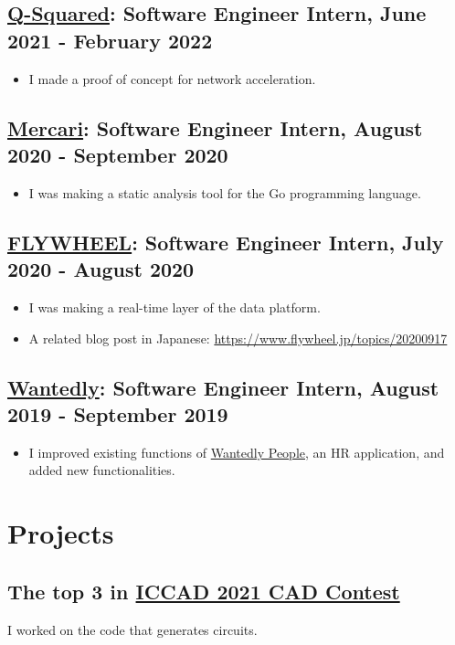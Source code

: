 \documentclass[12pt]{article}
\begin{document}
  \subsection*{\href{https://q-squared.jp}{Q-Squared}: Software Engineer Intern, June 2021 - February 2022}
    \begin{itemize}
      \item I made a proof of concept for network acceleration.
    \end{itemize}
  \subsection*{\href{https://about.mercari.com/en}{Mercari}: Software Engineer Intern, August 2020 - September 2020}
    \begin{itemize}
      \item I was making a static analysis tool for the Go programming language.
    \end{itemize}
  \subsection*{\href{https://www.flywheel.jp}{FLYWHEEL}: Software Engineer Intern, July 2020 - August 2020}
    \begin{itemize}
      \item I was making a real-time layer of the data platform.
      \item A related blog post in Japanese: \url{https://www.flywheel.jp/topics/20200917}
    \end{itemize}
  \subsection*{\href{https://wantedlyinc.com/ja}{Wantedly}: Software Engineer Intern, August 2019 - September 2019}
    \begin{itemize}
      \item I improved existing functions of \href{https://people.wantedly.com/}{Wantedly People}, an HR application, and added new functionalities.
    \end{itemize}

\section*{Projects}
  \subsection*{The top 3 in \href{http://iccad-contest.org/2021/}{ICCAD 2021 CAD Contest}}
    I worked on the code that generates circuits.
\end{document}
